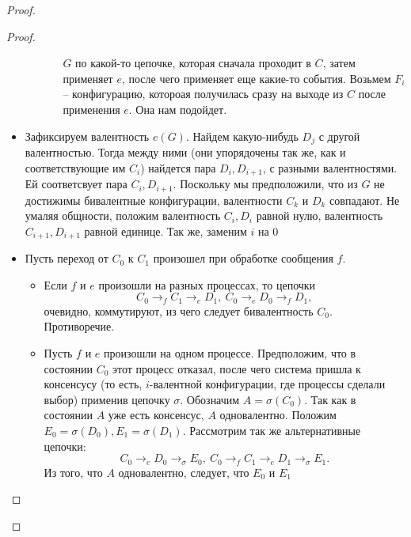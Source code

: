 \begin{proof}
\begin{proof}
\begin{itemize}
\begin{itemize}
\begin{itemize}
                                $G$ по какой-то цепочке, которая сначала проходит в $C$,
                                затем применяет $e$, после чего применяет еще какие-то события.
                                Возьмем $F_i$ -- конфигурацию, котороая получилась сразу
                                на выходе из $C$ после применения $e$. Она нам подойдет.
                        \end{itemize}
                \end{itemize}
            \item Зафиксируем валентность $e(G)$. Найдем какую-нибудь $D_j$ с другой
                валентностью. Тогда между ними (они упорядочены так же, как и 
                соответствующие им $C_i$) найдется пара $D_i, D_{i + 1}$, с разными
                валентностями. Ей соответсвует пара $C_i, D_{i + 1}$. Поскольку
                мы предположили, что из $G$ не достижимы бивалентные конфигурации,
                валентности $C_k$ и $D_k$ совпадают. Не умаляя общности, положим
                валентность $C_i, D_i$ равной нулю, валентность $C_{i + 1}, D_{i + 1}$
                равной единице. Так же, заменим $i$ на 0
            \item Пусть переход от $C_0$ к $C_1$ произошел при обработке сообщения $f$.
                \begin{itemize}
                    \item Если $f$ и $e$ произошли на разных процессах, то цепочки
                        \[
                            C_0 \to_f C_1 \to_e D_1,~ C_0 \to_e D_0 \to_f D_1
                        ,\]
                        очевидно, коммутируют, из чего следует бивалентность $C_0$.
                        Противоречие.
                    \item Пусть $f$ и $e$ произошли на одном процессе. Предположим,
                        что в состоянии $C_0$ этот процесс отказал, после чего система
                        пришла к консенсусу (то есть, $i$-валентной конфигурации, где
                        процессы сделали выбор) применив цепочку $\sigma$. Обозначим
                        $A = \sigma(C_0)$. Так как в состоянии $A$ уже есть консенсус,
                        $A$ одновалентно. Положим $E_0 = \sigma(D_0), E_1 = \sigma(D_1)$.
                        Рассмотрим так же альтернативные цепочки:
                        \[
                            C_0 \to_e D_0 \to_\sigma E_0,~ C_0 \to_f C_1 \to_e D_1 \to_\sigma E_1
                        .\]
                        Из того, что $A$ одновалентно, следует, что $E_0$ и $E_1$

\end{itemize}
\end{itemize}
\end{proof}
\end{proof}

